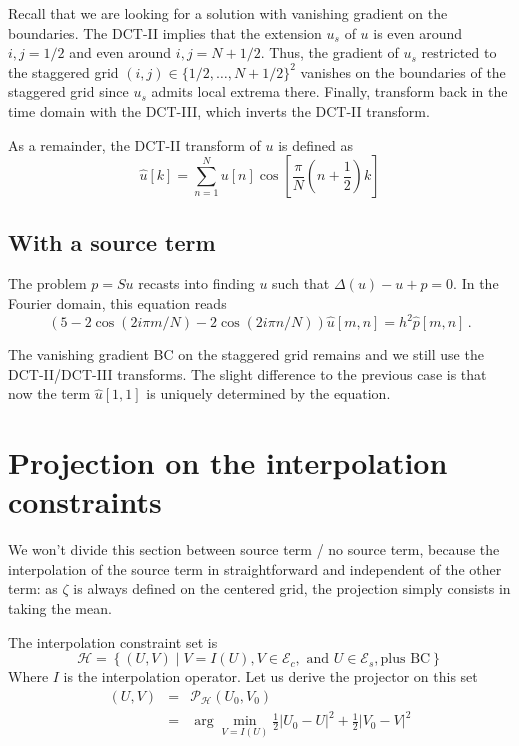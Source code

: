 \documentclass[13pt,aps,prb,preprint]{article}
\begin{document}
Recall that we are looking for a solution with vanishing gradient on the boundaries. The DCT-II implies that the extension $u_s$ of $u$ is even around $i,j=1/2$ and even around $i,j =N+1/2$. Thus, the gradient of $u_s$ restricted to the staggered grid $(i,j)\in \{1/2,\dots,N+1/2 \}^2$ vanishes on the boundaries of the staggered grid since $u_s$ admits local extrema there. Finally, transform back in the time domain with the DCT-III, which inverts the DCT-II transform.

As a remainder, the DCT-II transform of $u$ is defined as
\begin{equation}
\hat{u}[k] = \sum_{n=1}^{N} u[n] \cos \left[ \frac{\pi}{N} (n+\frac{1}{2})k  \right]
\end{equation}

\subsection{With a source term}
The problem $p=Su$ recasts into finding $u$ such that $\Delta (u) - u +p = 0$. In the Fourier domain, this equation reads
\begin{equation}
\left( 5 -2 \cos (2i\pi m/N) -2 \cos (2i\pi n/N) \right) \hat{u}[m,n] = h^2 \hat{p}[m,n] \, .
\end{equation}

The vanishing gradient BC on the staggered grid remains and we still use the DCT-II/DCT-III transforms. The slight difference to the previous case is that now the term $\hat{u}[1,1]$ is uniquely determined by the equation.

\section{Projection on the interpolation constraints}
We won't divide this section between source term / no source term, because the interpolation of the source term in straightforward and independent of the other term: as $\zeta$ is always defined on the centered grid, the projection simply consists in taking the mean.

The interpolation constraint set is
$$  \mathcal{H} = \left\{ (U,V) \mid V = I(U) , V \in \mathcal{E}_c, \text{ and } U \in \mathcal{E}_s, \text{plus BC} \right\}$$
Where $I$ is the interpolation operator. Let us derive the projector on this set
\begin{eqnarray}
(U,V) & = & \mathscr{P}_{\mathcal{H}} (U_0, V_0) \\
& = & \arg \min_{V=I(U)} \frac{1}{2} \vert U_0-U \vert^2 + \frac{1}{2} \vert V_0 - V \vert^2
\end{eqnarray}
\end{document}
